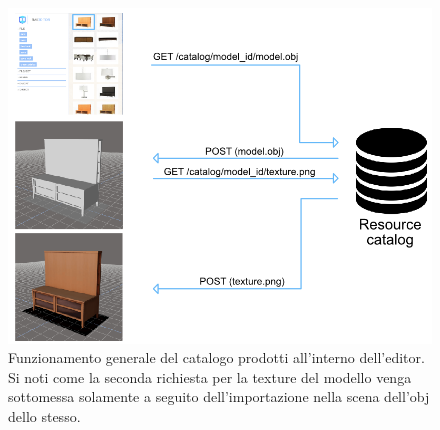 \begin{figure}[htb]
 \centering
 \includegraphics[width=1\linewidth]{images/chapter_creazione_scena/editor_2.png}\hfill
 \caption[Catalogo prodotti]{Funzionamento generale del catalogo prodotti all'interno dell'editor. Si noti come la seconda richiesta per la texture del modello venga sottomessa solamente a seguito dell'importazione nella scena dell'obj dello stesso.}
 \label{fig:editor_2}
\end{figure}

